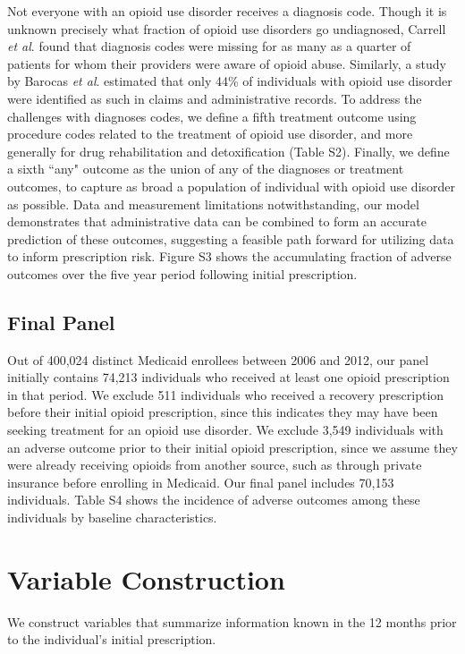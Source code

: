 \documentclass[10pt, letter]{article}
\begin{document}
Not everyone with an opioid use disorder receives a diagnosis code. Though it is unknown precisely what fraction of opioid use disorders go undiagnosed, Carrell {\em et al}. found that diagnosis codes were missing for as many as a quarter of patients for whom their providers were aware of opioid abuse. Similarly, a study by Barocas {\em et al}. estimated that only 44\% of individuals with opioid use disorder were identified as such in claims and administrative records. To address the challenges with diagnoses codes, we define a fifth treatment outcome using procedure codes related to the treatment of opioid use disorder, and more generally for drug rehabilitation and detoxification (Table S2). Finally, we define a sixth ``any" outcome as the union of any of the diagnoses or treatment outcomes, to capture as broad a population of individual with opioid use disorder as possible. Data and measurement limitations notwithstanding, our model demonstrates that administrative data can be combined to form an accurate prediction of these outcomes, suggesting a feasible path forward for utilizing data to inform prescription risk. Figure S3 shows the accumulating fraction of adverse outcomes over the five year period following initial prescription.

\subsection{Final Panel}

Out of 400,024 distinct Medicaid enrollees between 2006 and 2012, our panel initially contains 74,213 individuals who received at least one opioid prescription in that period. We exclude 511 individuals who received a recovery prescription before their initial opioid prescription, since this indicates they may have been seeking treatment for an opioid use disorder. We exclude 3,549 individuals with an adverse outcome prior to their initial opioid prescription, since we assume they were already receiving opioids from another source, such as through private insurance before enrolling in Medicaid. Our final panel includes 70,153 individuals. Table S4 shows the incidence of adverse outcomes among these individuals by baseline characteristics.

\section{Variable Construction}

We construct variables that summarize information known in the 12 months prior to the individual's initial prescription.
\end{document}
